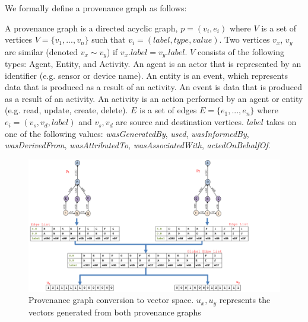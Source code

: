 We formally define a provenance graph as follows:

\begin{definition}

A provenance graph is a directed acyclic graph, $p = (v_i, e_i)$ where $V$ is a set of vertices $V =\{v_1,...,v_n\}$ such that $v_i = (label, type, value)$. Two vertices $v_x$, $v_y$ are similar (denoted $ v_x \sim v_y$) if $v_x.label = v_y.label$. $V$ consists of the following types: Agent, Entity, and Activity.  An agent is an actor that is represented by an identifier (e.g. sensor or device name). An entity is an event, which represents data that is produced as a result of an activity. An event is data that is produced as a result of an activity. An activity is an action performed by an agent or entity (e.g. read, update, create, delete). $E$ is a set of edges $E =\{e_1,..., e_n\}$ where $e_i = (v_s, v_d, label)$ and $v_s, v_d$ are source and destination vertices. $label$ takes on one of the following values: \textit{wasGeneratedBy}, \textit{used}, \textit{wasInformedBy}, \textit{wasDerivedFrom}, \textit{wasAttributedTo}, \textit{wasAssociatedWith}, \textit{actedOnBehalfOf}. 




\end{definition}


\begin{figure}
\begin{center}
\includegraphics[width=\textwidth]{vector6.pdf}
\end{center}
\caption{Provenance graph conversion to vector space. $u_x, u_y$ represents the vectors generated from both provenance graphs}
\label{prov_vector}
\end{figure}


